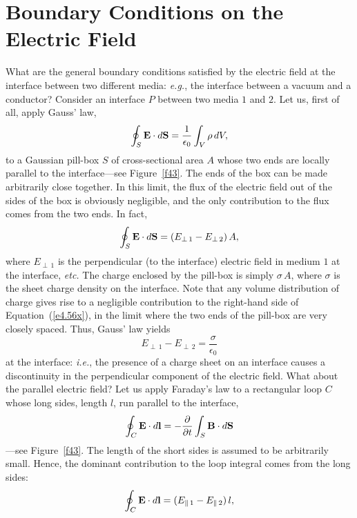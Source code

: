\section{Boundary Conditions on the Electric Field}
What are the  general boundary conditions satisfied by the electric field
at the interface between two different media: {\em e.g.}, the interface between a vacuum
and a conductor? Consider an interface $P$ between two media $1$ and $2$.
Let us, first of all, apply Gauss' law,
\begin{equation}\label{e4.56x}
\oint_S {\bf E} \cdot d{\bf S} = \frac{1}{\epsilon_0} \int_V \rho \,dV,
\end{equation}
to a Gaussian pill-box $S$ of cross-sectional area $A$ whose two ends are 
locally parallel to the interface---see Figure~\ref{f43}. The ends of the box can be made arbitrarily
close together. In this limit, the flux of the electric field out of the sides
of the box is obviously negligible, and the only contribution to the flux comes
from the two ends. In fact,
\begin{equation}
\oint_S {\bf E} \cdot d{\bf S} = ( E_{\perp\,1} - E_{\perp\,2})\,A,
\end{equation}
where $E_{\perp\,1}$ is the perpendicular (to the interface)
electric field in
medium $1$ at the interface, {\em etc.} The charge enclosed by the pill-box is
simply $\sigma\,A$, where $\sigma$ is the sheet charge density on the interface.
Note that any volume distribution of charge gives rise to a negligible contribution
to the right-hand side of Equation~(\ref{e4.56x}), in the limit where the two
ends of the pill-box are very closely spaced. Thus, Gauss' law
yields
\begin{equation}
E_{\perp\,1} - E_{\perp \,2} = \frac{\sigma}{\epsilon_0}
\end{equation}
at the interface: {\em i.e.}, 
the presence of a  charge sheet on an interface causes  a discontinuity in the
perpendicular component of the electric field. What about the parallel electric
field? Let us apply Faraday's law to a rectangular
 loop $C$ whose long sides, length $l$, run parallel to the interface,
\begin{equation}
\oint_C {\bf E} \cdot d{\bf l} = -\frac{\partial}{\partial t} \int_S {\bf B}\cdot
d{\bf S}
\end{equation}
---see Figure~\ref{f43}.
The length of the short sides is assumed to be arbitrarily small. Hence, the dominant
contribution to the loop integral comes from the long sides:
\begin{equation}
\oint_C {\bf E} \cdot d{\bf l} = (E_{\parallel\,1} - E_{\parallel\,2} )\, l,
\end{equation}
